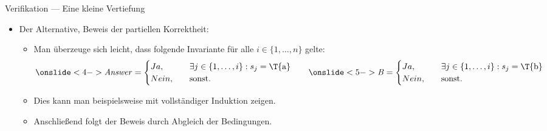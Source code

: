 {\begin{frame}{Verifikation --- Eine kleine Vertiefung}
   \begin{itemize}[<+(1)->]
    \item Der Alternative,  Beweis der partiellen Korrektheit: \begin{itemize}
        \itemsep5pt
        \item Man überzeuge sich leicht, dass folgende Invariante für alle \(i \in \{1, \ldots, n\}\) gelte: \begin{equation*}
            \onslide<4->{\a = \begin{cases}
                Ja, & \exists j \in \{1, \ldots, i\}: s_j = \text{\T{a}}\\
                Nein,\quad & \text{sonst.}
            \end{cases}} \qquad \onslide<5->{\b = \begin{cases}
                Ja, & \exists j \in \{1, \ldots, i\}: s_j = \text{\T{b}}\\
                Nein,\quad & \text{sonst.}
            \end{cases}}\vspace*{-4mm}
        \end{equation*}
        \item<6-> Dies kann man beispielsweise mit vollständiger Induktion zeigen.
        \item<7-> Anschließend folgt der Beweis durch Abgleich der Bedingungen.
    \end{itemize}
   \end{itemize}
\end{frame}
\fi


}
